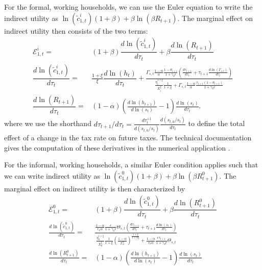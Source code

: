 For the formal, working households, we can use the Euler equation to write the indirect utility as $\ln\left(\tilde{c}_{1,t}^i\right)\left(1+\beta\right)+\beta\ln\left(\beta R_{t+1}\right)$. The marginal effect on indirect utility then consists of the two terms:
\begin{align*}
    \mathcal{E}_{1,t}^i =& (1+\beta)\dfrac{d\ln\left(\tilde{c}_{1,t}^i\right)}{d\tau_t} + \beta \dfrac{d \ln\left(R_{t+1}\right)}{d\tau_t} \\
    \dfrac{d\ln\left(\tilde{c}_{1,t}^i\right)}{d\tau_t} =& \frac{1+\xi}{\xi}\dfrac{d\ln\left(h_t\right)}{d\tau_t}+\frac{\Gamma_{s,t}\frac{1-\alpha}{\alpha}\frac{1-\theta_{t+1}}{1+\gamma_0\epsilon}\left(\frac{d\tau_{t+1}}{d\tau_t}+\tau_{t+1}\frac{d\ln\left(\Gamma_{s,t}\right)}{d\tau_t}\right)}{\frac{\eta_{i}^{1+\xi}}{X_{i}^{\xi}}\frac{1}{1+\xi}+\Gamma_{s,t}\frac{1-\alpha}{\alpha}\frac{\tau_{t+1}(1-\theta_{t+1})}{1+\gamma_0\epsilon}} \\ 
    \dfrac{d \ln\left(R_{t+1}\right)}{d\tau_t} =& (1-\alpha)\left(\frac{d\ln\left(h_{t+1}\right)}{d\ln\left(s_t\right)}-1\right)\frac{d\ln\left(s_t\right)}{d\tau_t}.
\end{align*}
where we use the shorthand $d\tau_{t+1}/d\tau_t = \frac{d \tau_t^{+1}}{d (s_{t,0}/s_t)}\frac{d (s_{t,0}/s_t)}{d\tau_t}$ to define the total effect of a change in the tax rate on future taxes. The technical documentation gives the computation of these derivatives in the numerical application \parencite[section \textit{Informal Savings Model}]{BergGE26doc}.

For the informal, working households, a similar Euler condition applies such that we can write indirect utility as $\ln\left(\tilde{c}_{1,t}^0\right)\left(1+\beta\right)+\beta \ln\left(\beta R_{t+1}^0\right)$.
The marginal effect on indirect utility is then characterized by
\begin{align*}
    \mathcal{E}_{1,t}^0 =& (1+\beta)\dfrac{d\ln\left(\tilde{c}_{1,t}^0\right)}{d\tau_t} + \beta\dfrac{d \ln\left(R_{t+1}^0\right)}{d\tau_t} \\
    \frac{d\ln\left(\tilde{c}_{1,t}^0\right)}{d\tau_t} =& \frac{\frac{1-\alpha}{r_0\alpha}\frac{\epsilon}{1+\gamma_0\epsilon}\Theta_{s,t}\left(\frac{d\tau_{t+1}}{d\tau_t}+\tau_{t+1}\frac{d\ln\left(s_t\right)}{d\tau_t}\right)}{\frac{\eta_{0}^{1+\xi}}{X_{0}^{\xi}}\frac{1}{1+\xi}\left(\frac{1-\alpha}{\Gamma_{h}^{\alpha}}\right)^{\frac{1+\xi}{1+\alpha\xi}}+\frac{1-\alpha}{r_0\alpha}\frac{\epsilon\tau_{t+1}}{1+\gamma_0\epsilon}\Theta_{s,t}} \\
    \frac{d\ln\left(R_{t+1}^0\right)}{d\tau_t} =& (1-\alpha)\left(\frac{d\ln\left(h_{t+1}\right)}{d\ln\left(s_t\right)}-1\right)\frac{d\ln\left(s_t\right)}{d\tau_t}
\end{align*}



